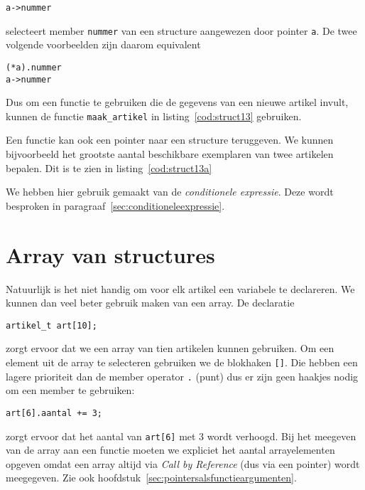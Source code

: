 \hspace*{1em}\texttt{a->nummer}

selecteert member \texttt{nummer} van een structure aangewezen door pointer \texttt{a}. De twee volgende voorbeelden zijn daarom equivalent

\hspace*{1em}\texttt{(*a).nummer}\\
\hspace*{1em}\texttt{a->nummer}

Dus om een functie te gebruiken die de gegevens van een nieuwe artikel invult, kunnen de functie \texttt{maak\_artikel} in listing~\ref{cod:struct13} gebruiken.


Een functie kan ook een pointer naar een structure teruggeven. We kunnen bijvoorbeeld het grootste aantal beschikbare exemplaren van twee artikelen bepalen. Dit is te zien in listing~\ref{cod:struct13a}


We hebben hier gebruik gemaakt van de \textsl{conditionele expressie}. Deze wordt besproken in paragraaf~\ref{sec:conditioneleexpressie}.

\section{Array van structures}
Natuurlijk is het niet handig om voor elk artikel een variabele te declareren. We kunnen dan veel beter gebruik maken van een array. De declaratie

\hspace*{1em}\texttt{artikel\_t art[10];}

zorgt ervoor dat we een array van tien artikelen kunnen gebruiken. Om een element uit de array te selecteren gebruiken we de blokhaken \texttt{[]}. Die hebben een lagere prioriteit dan de member operator \texttt{.} (punt) dus er zijn geen haakjes nodig om een member te gebruiken:

\hspace*{1em}\texttt{art[6].aantal += 3;}

zorgt ervoor dat het aantal van \texttt{art[6]} met 3 wordt verhoogd. Bij het meegeven van de array aan een functie moeten we expliciet het aantal arrayelementen opgeven omdat een array altijd via \textsl{Call by Reference} (dus via een pointer) wordt meegegeven. Zie ook hoofdstuk~\ref{sec:pointersalsfunctieargumenten}.

